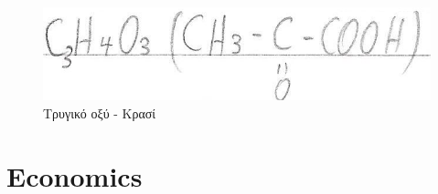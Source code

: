 \documentclass[12pt]{article}
\begin{document}
\begin{flushleft}
	\begin{figure}[H]
	\centering
	\includegraphics[scale=1.4]{pirostafilikoOxi}
	\caption{\textgreek{Τρυγικό οξύ - Κρασί}}
	\label{fig:pirostafilikoOxi}
	\end{figure}
	
	
	\pagebreak
	
	
	\section{Economics}
	

\end{flushleft}
\end{document}
